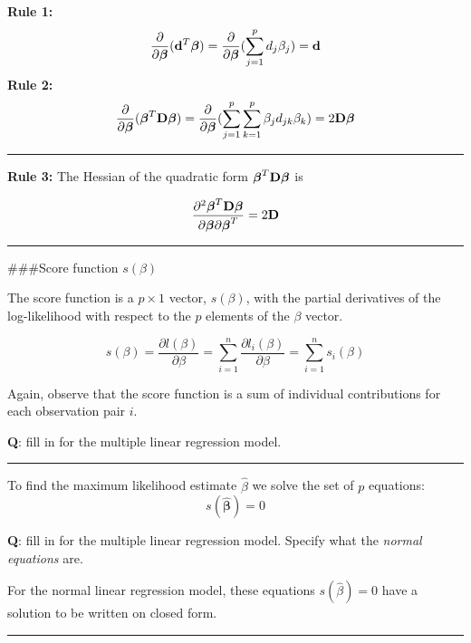 \documentclass[
]{article}
\begin{document}
\textbf{Rule 1:}
\[\frac{\partial}{\partial \boldsymbol{\beta}}({\bf d}^T\boldsymbol{\beta})=\frac{\partial}{\partial \boldsymbol{\beta}}(\sum_{j=1}^p d_j \beta_j)={\bf d}\]
\textbf{Rule 2:}
\[\frac{\partial}{\partial \boldsymbol{\beta}}(\boldsymbol{\beta}^T{\bf D}\boldsymbol{\beta})=\frac{\partial}{\partial \boldsymbol{\beta}}(\sum_{j=1}^p \sum_{k=1}^p \beta_j d_{jk} \beta_k)=2{\bf D}\boldsymbol{\beta}\]

\begin{center}\rule{0.5\linewidth}{0.5pt}\end{center}

\textbf{Rule 3:} The Hessian of the quadratic form
\(\boldsymbol{\beta}^T{\bf D}\boldsymbol{\beta}\) is

\[\frac{\partial^2 \boldsymbol{\beta}^T{\bf D}\boldsymbol{\beta}}{\partial \boldsymbol{\beta}\partial \boldsymbol{\beta}^T}= 2{\bf D}\]

\begin{center}\rule{0.5\linewidth}{0.5pt}\end{center}

\#\#\#Score function \(s(\beta)\)

The score function is a \(p\times 1\) vector, \(s(\beta)\), with the
partial derivatives of the log-likelihood with respect to the \(p\)
elements of the \(\beta\) vector.

\[s(\beta)=\frac{\partial l(\beta)}{\partial \beta}=
\sum_{i=1}^n \frac{\partial l_i(\beta)}{\partial \beta}=
\sum_{i=1}^n s_i(\beta)\]

Again, observe that the score function is a sum of individual
contributions for each observation pair \(i\).

\textbf{Q}: fill in for the multiple linear regression model.

\begin{center}\rule{0.5\linewidth}{0.5pt}\end{center}

To find the maximum likelihood estimate \(\hat{\beta}\) we solve the set
of \(p\) equations: \[s(\hat{\boldsymbol{\beta}})=0\]

\textbf{Q}: fill in for the multiple linear regression model. Specify
what the \emph{normal equations} are.

For the normal linear regression model, these equations
\(s(\hat{\beta})=0\) have a solution to be written on closed form.

\begin{center}\rule{0.5\linewidth}{0.5pt}\end{center}
\end{document}

